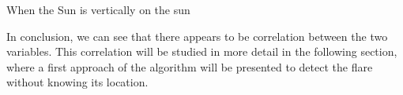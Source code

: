 When the Sun is vertically on the sun





In conclusion, we can see that there appears to be correlation between the two variables. This correlation will be studied in more detail in the following section, where a first approach of the algorithm will be presented to detect the flare without knowing its location.













